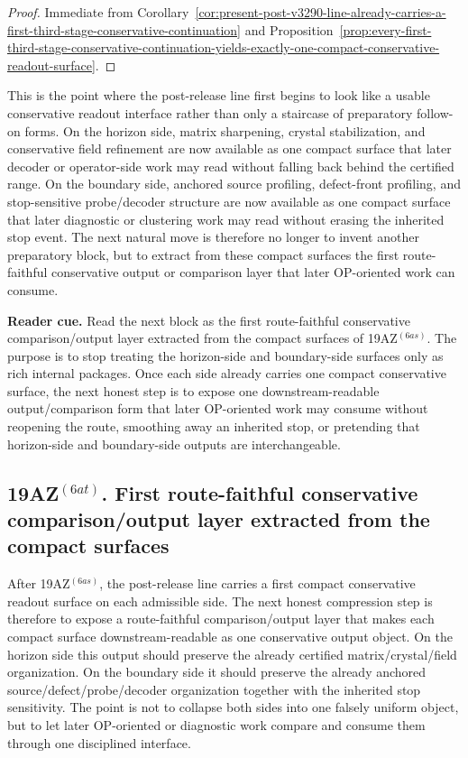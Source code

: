 \begin{proof}
Immediate from Corollary~\ref{cor:present-post-v3290-line-already-carries-a-first-third-stage-conservative-continuation} and Proposition~\ref{prop:every-first-third-stage-conservative-continuation-yields-exactly-one-compact-conservative-readout-surface}.
\end{proof}

\begin{remark}
\label{rem:what-the-first-compact-conservative-readout-surface-now-buys}
This is the point where the post-release line first begins to look like a usable conservative readout interface rather than only a staircase of preparatory follow-on forms. On the horizon side, matrix sharpening, crystal stabilization, and conservative field refinement are now available as one compact surface that later decoder or operator-side work may read without falling back behind the certified range. On the boundary side, anchored source profiling, defect-front profiling, and stop-sensitive probe/decoder structure are now available as one compact surface that later diagnostic or clustering work may read without erasing the inherited stop event. The next natural move is therefore no longer to invent another preparatory block, but to extract from these compact surfaces the first route-faithful conservative output or comparison layer that later OP-oriented work can consume.
\end{remark}


\noindent\textbf{Reader cue.} Read the next block as the first route-faithful conservative comparison/output layer extracted from the compact surfaces of 19AZ$^{(6as)}$. The purpose is to stop treating the horizon-side and boundary-side surfaces only as rich internal packages. Once each side already carries one compact conservative surface, the next honest step is to expose one downstream-readable output/comparison form that later OP-oriented work may consume without reopening the route, smoothing away an inherited stop, or pretending that horizon-side and boundary-side outputs are interchangeable.

\subsection*{19AZ$^{(6at)}$. First route-faithful conservative comparison/output layer extracted from the compact surfaces}
\label{sec:first-route-faithful-conservative-comparison-output-layer-extracted-from-the-compact-surfaces}
After 19AZ$^{(6as)}$, the post-release line carries a first compact conservative readout surface on each admissible side. The next honest compression step is therefore to expose a route-faithful comparison/output layer that makes each compact surface downstream-readable as one conservative output object. On the horizon side this output should preserve the already certified matrix/crystal/field organization. On the boundary side it should preserve the already anchored source/defect/probe/decoder organization together with the inherited stop sensitivity. The point is not to collapse both sides into one falsely uniform object, but to let later OP-oriented or diagnostic work compare and consume them through one disciplined interface.


